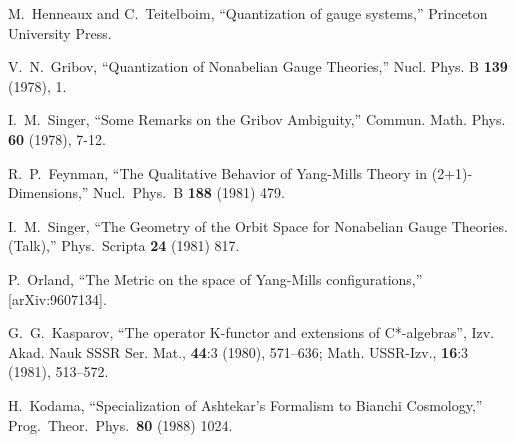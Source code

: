 \documentclass[letterpaper,12pt]{article}
\begin{document}
\begin{thebibliography}{99}
M.~Henneaux and C.~Teitelboim,
``Quantization of gauge systems,''
Princeton University Press.






V.~N.~Gribov,
``Quantization of Nonabelian Gauge Theories,''
Nucl. Phys. B \textbf{139} (1978), 1.



I.~M.~Singer,
``Some Remarks on the Gribov Ambiguity,''
Commun. Math. Phys. \textbf{60} (1978), 7-12.








  R.~P.~Feynman,
  ``The Qualitative Behavior of Yang-Mills Theory in (2+1)-Dimensions,''
  Nucl.\ Phys.\ B {\bf 188} (1981) 479.

 
  I.~M.~Singer,
  ``The Geometry of the Orbit Space for Nonabelian Gauge Theories. (Talk),''
  Phys.\ Scripta {\bf 24} (1981) 817.


  P.~Orland,
  ``The Metric on the space of Yang-Mills configurations,''
  [arXiv:9607134].




G.~G.~Kasparov, 
``The operator K-functor and extensions of C*-algebras'', 
Izv. Akad. Nauk SSSR Ser. Mat., {\bf 44}:3 (1980), 571–636; Math. USSR-Izv., {\bf 16}:3 (1981), 513–572.



  H.~Kodama,
  ``Specialization of Ashtekar's Formalism to Bianchi Cosmology,''
  Prog.\ Theor.\ Phys.\  {\bf 80} (1988) 1024.




\end{thebibliography}
\end{document}
